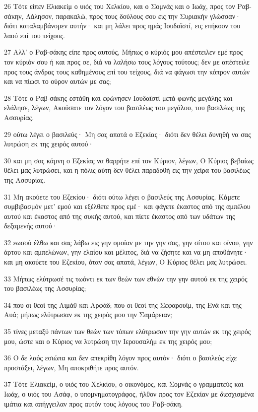 \par 26 Τότε είπεν Ελιακείμ ο υιός του Χελκίου, και ο Σομνάς και ο Ιωάχ, προς τον Ραβ-σάκην, Λάλησον, παρακαλώ, προς τους δούλους σου εις την Συριακήν γλώσσαν· διότι καταλαμβάνομεν αυτήν· και μη λάλει προς ημάς Ιουδαϊστί, εις επήκοον του λαού επί του τείχους.
\par 27 Αλλ' ο Ραβ-σάκης είπε προς αυτούς, Μήπως ο κύριός μου απέστειλεν εμέ προς τον κύριόν σου ή και προς σε, διά να λαλήσω τους λόγους τούτους; δεν με απέστειλε προς τους άνδρας τους καθημένους επί του τείχους, διά να φάγωσι την κόπρον αυτών και να πίωσι το ούρον αυτών με σας;
\par 28 Τότε ο Ραβ-σάκης εστάθη και εφώνησεν Ιουδαϊστί μετά φωνής μεγάλης και ελάλησε, λέγων, Ακούσατε τον λόγον του βασιλέως του μεγάλου, του βασιλέως της Ασσυρίας.
\par 29 ούτω λέγει ο βασιλεύς· Μη σας απατά ο Εζεκίας· διότι δεν θέλει δυνηθή να σας λυτρώση εκ της χειρός αυτού·
\par 30 και μη σας κάμνη ο Εζεκίας να θαρρήτε επί τον Κύριον, λέγων, Ο Κύριος βεβαίως θέλει μας λυτρώσει, και η πόλις αύτη δεν θέλει παραδοθή εις την χείρα του βασιλέως της Ασσυρίας.
\par 31 Μη ακούετε του Εζεκίου· διότι ούτω λέγει ο βασιλεύς της Ασσυρίας. Κάμετε συμβιβασμόν μετ' εμού και εξέλθετε προς εμέ· και φάγετε έκαστος από της αμπέλου αυτού και έκαστος από της συκής αυτού, και πίετε έκαστος από των υδάτων της δεξαμενής αυτού·
\par 32 εωσού έλθω και σας λάβω εις γην ομοίαν με την γην σας, γην σίτου και οίνου, γην άρτου και αμπελώνων, γην ελαίου και μέλιτος, διά να ζήσητε και να μη αποθάνητε· και μη ακούετε του Εζεκίου, όταν σας απατά, λέγων, Ο Κύριος θέλει μας λυτρώσει.
\par 33 Μήπως ελύτρωσέ τις τωόντι εκ των θεών των εθνών την γην αυτού εκ της χειρός του βασιλέως της Ασσυρίας;
\par 34 που οι θεοί της Αιμάθ και Αρφάδ; που οι θεοί της Σεφαρουΐμ, της Ενά και της Αυά; μήπως ελύτρωσαν εκ της χειρός μου την Σαμάρειαν;
\par 35 τίνες μεταξύ πάντων των θεών των τόπων ελύτρωσαν την γην αυτών εκ της χειρός μου, ώστε και ο Κύριος να λυτρώση την Ιερουσαλήμ εκ της χειρός μου;
\par 36 Ο δε λαός εσιώπα και δεν απεκρίθη λόγον προς αυτόν· διότι ο βασιλεύς είχε προστάξει, λέγων, Μη αποκριθήτε προς αυτόν.
\par 37 Τότε Ελιακείμ, ο υιός του Χελκίου, ο οικονόμος, και Σομνάς ο γραμματεύς και Ιωάχ, ο υιός του Ασάφ, ο υπομνηματογράφος, ήλθον προς τον Εζεκίαν με διεσχισμένα ιμάτια και απήγγειλαν προς αυτόν τους λόγους του Ραβ-σάκη.


